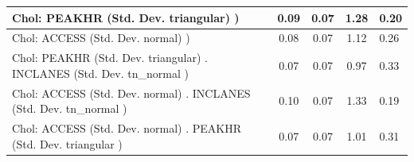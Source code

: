 \begin{table}
\begin{center}
\begin{tabular}{|l|l|c|c|c|l|}
			\hline
			 Chol: PEAKHR (Std. Dev. triangular) ) &  & 0.09 & 0.07 & 1.28 & 0.20 \\
			\hline
			 Chol: ACCESS (Std. Dev. normal) ) &  & 0.08 & 0.07 & 1.12 & 0.26 \\
			\hline
			 Chol: PEAKHR (Std. Dev. triangular) . INCLANES (Std. Dev.   tn_normal ) &  & 0.07 & 0.07 & 0.97 & 0.33 \\
			\hline
			 Chol: ACCESS (Std. Dev. normal) . INCLANES (Std. Dev.   tn_normal ) &  & 0.10 & 0.07 & 1.33 & 0.19 \\
			\hline
			 Chol: ACCESS (Std. Dev. normal) . PEAKHR (Std. Dev.   triangular ) &  & 0.07 & 0.07 & 1.01 & 0.31 \\
			\hline
		\end{tabular}
	\end{center}
\end{table}